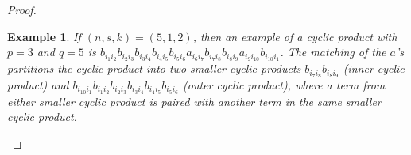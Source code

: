 \documentclass[11pt,reqno]{amsart}
\numberwithin{equation}{section}
\theoremstyle{plain}
\newtheorem{example}[thm]{Example}
\begin{document}
\begin{proof}
\begin{example}
If $(n, s, k)=(5, 1, 2)$, then an example of a cyclic product with $p=3$ and $q=5$ is $b_{i_1i_2}b_{i_2i_3}b_{i_3i_4}b_{i_4i_5}b_{i_5i_6}a_{i_6i_7}b_{i_7i_8}b_{i_8i_9}a_{i_9i_{10}}b_{i_{10}i_1}$. The matching of the $a$'s partitions the cyclic product into two smaller cyclic products $b_{i_7i_8}b_{i_8i_9}$ (inner cyclic product) and $b_{i_{10}i_1}b_{i_1i_2}b_{i_2i_3}b_{i_3i_4}b_{i_4i_5}b_{i_5i_6}$ (outer cyclic product), where a term from either smaller cyclic product is paired with another term in the same smaller cyclic product.
\end{example}







\end{proof}
\end{document}
